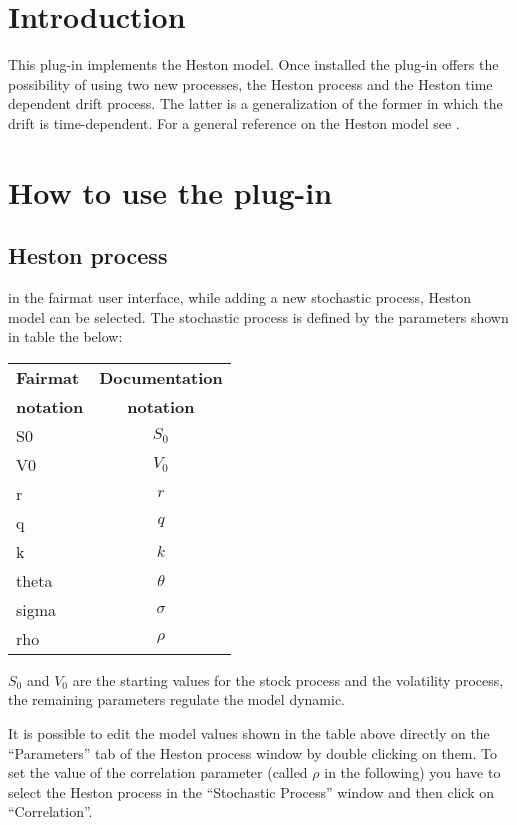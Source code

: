 \newcommand{\pluginName}{Heston Model}
\newcommand{\pluginVersion}{1.0.9}





\PluginTitle{\pluginName}{\pluginVersion}

\section{Introduction}
This plug-in implements the Heston model. Once installed the plug-in offers the possibility of using two new processes, the Heston process and the Heston time dependent drift process. 
The latter is a generalization of the former in which the drift is time-dependent. For a general reference on the Heston model see \cite{Heston:ClosedFormSol}.

\section{How to use the plug-in}

\subsection{Heston process}
in the fairmat user interface, while adding a new stochastic process, Heston model can be selected.
The stochastic process is defined by the parameters shown in table the below:
\begin{center}
\begin{tabular}{|l|c|}
  \hline
\textbf{Fairmat}&\textbf{Documentation}\\
\textbf{notation}&\textbf{notation}\\
                     \hline
 S0     & $S_0$\\
 V0     & $V_0$\\
 r  & $r$\\
 q  & $q$\\
 k      & $k$ \\
 theta  & $\theta$\\
 sigma  & $\sigma$\\
rho & $\rho$ \\ 
   \hline
\end{tabular}
\end{center}
$S_0$ and $V_0$ are the starting values for the stock process and the volatility process, the remaining parameters regulate the model dynamic.

It is possible to edit the model values shown in the table above directly on the ``Parameters'' tab of the Heston process window by double clicking on them. To set the value of the correlation parameter (called $\rho$ in the following) you have to select the Heston process in the ``Stochastic Process'' window and then click on ``Correlation''.

